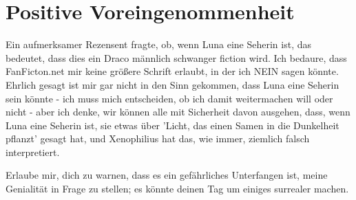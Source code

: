 \chapter{Positive Voreingenommenheit}

\begin{chapterOpeningAuthorNote}
% 
Ein aufmerksamer Rezensent fragte, ob, wenn Luna eine Seherin ist, das bedeutet, dass dies ein Draco männlich schwanger fiction wird. Ich bedaure, dass FanFicton.net mir keine größere Schrift erlaubt, in der ich NEIN sagen könnte. Ehrlich gesagt ist mir gar nicht in den Sinn gekommen, dass Luna eine Seherin sein könnte - ich muss mich entscheiden, ob ich damit weitermachen will oder nicht - aber ich denke, wir können alle mit Sicherheit davon ausgehen, dass, wenn Luna eine Seherin ist, sie etwas über 'Licht, das einen Samen in die Dunkelheit pflanzt' gesagt hat, und Xenophilius hat das, wie immer, ziemlich falsch interpretiert.
\end{chapterOpeningAuthorNote}
\begin{chapterOpeningQuote}
Erlaube mir, dich zu warnen, dass es ein gefährliches Unterfangen ist, meine Genialität in Frage zu stellen; es könnte deinen Tag um einiges surrealer machen.
\end{chapterOpeningQuote}

